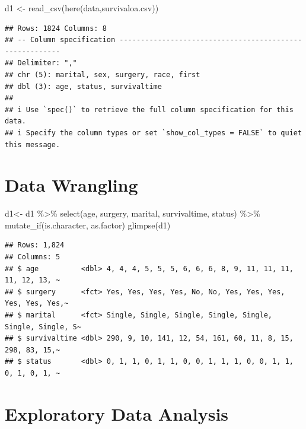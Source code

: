 \documentclass[
  10pt,
]{krantz}
\newenvironment{Shaded}{\begin{snugshade}}{\end{snugshade}}
\newcommand{\FunctionTok}[1]{\textcolor[rgb]{0.00,0.00,0.00}{#1}}
\newcommand{\NormalTok}[1]{#1}
\newcommand{\OtherTok}[1]{\textcolor[rgb]{0.56,0.35,0.01}{#1}}
\newcommand{\SpecialCharTok}[1]{\textcolor[rgb]{0.00,0.00,0.00}{#1}}
\newcommand{\StringTok}[1]{\textcolor[rgb]{0.31,0.60,0.02}{#1}}
\begin{document}
\begin{Shaded}
\begin{Highlighting}[]
\NormalTok{d1 }\OtherTok{\textless{}{-}} \FunctionTok{read\_csv}\NormalTok{(}\FunctionTok{here}\NormalTok{(}\StringTok{\textquotesingle{}data\textquotesingle{}}\NormalTok{,}\StringTok{\textquotesingle{}survivaloa.csv\textquotesingle{}}\NormalTok{))}
\end{Highlighting}
\end{Shaded}

\begin{verbatim}
## Rows: 1824 Columns: 8
## -- Column specification --------------------------------------------------------
## Delimiter: ","
## chr (5): marital, sex, surgery, race, first
## dbl (3): age, status, survivaltime
## 
## i Use `spec()` to retrieve the full column specification for this data.
## i Specify the column types or set `show_col_types = FALSE` to quiet this message.
\end{verbatim}

\hypertarget{data-wrangling-1}{%
\section{Data Wrangling}\label{data-wrangling-1}}

\begin{Shaded}
\begin{Highlighting}[]
\NormalTok{d1}\OtherTok{\textless{}{-}}\NormalTok{ d1 }\SpecialCharTok{\%\textgreater{}\%} \FunctionTok{select}\NormalTok{(age, surgery, marital, survivaltime, status) }\SpecialCharTok{\%\textgreater{}\%}
  \FunctionTok{mutate\_if}\NormalTok{(is.character, as.factor)}
\FunctionTok{glimpse}\NormalTok{(d1)}
\end{Highlighting}
\end{Shaded}

\begin{verbatim}
## Rows: 1,824
## Columns: 5
## $ age          <dbl> 4, 4, 4, 5, 5, 5, 6, 6, 6, 8, 9, 11, 11, 11, 11, 12, 13, ~
## $ surgery      <fct> Yes, Yes, Yes, Yes, No, No, Yes, Yes, Yes, Yes, Yes, Yes,~
## $ marital      <fct> Single, Single, Single, Single, Single, Single, Single, S~
## $ survivaltime <dbl> 290, 9, 10, 141, 12, 54, 161, 60, 11, 8, 15, 298, 83, 15,~
## $ status       <dbl> 0, 1, 1, 0, 1, 1, 0, 0, 1, 1, 1, 0, 0, 1, 1, 0, 1, 0, 1, ~
\end{verbatim}

\hypertarget{exploratory-data-analysis-1}{%
\section{Exploratory Data Analysis}\label{exploratory-data-analysis-1}}
\end{document}
